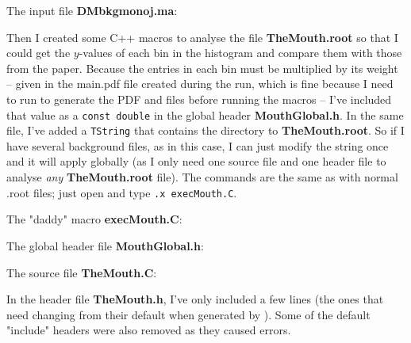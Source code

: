 The input file \textbf{DMbkgmonoj.ma}:



Then I created some C++ macros to analyse the file \textbf{TheMouth.root} so that I could get the $y$-values of each bin in the \etmiss histogram and compare them with those from the paper. Because the entries in each bin must be multiplied by its weight -- given in the main.pdf file created during the \madanalysis run, which is fine because I need to run \madanalysis to generate the PDF and \ROOT files before running the macros -- I've included that value as a \texttt{const double} in the global header \textbf{MouthGlobal.h}. In the same file, I've added a \texttt{TString} that contains the directory to \textbf{TheMouth.root}. So if I have several background files, as in this case, I can just modify the string once and it will apply globally (as I only need one source file and one header file to analyse \emph{any} \textbf{TheMouth.root} file). The commands are the same as with normal .root files; just open \ROOT and type \texttt{.x execMouth.C}.

The "daddy" macro \textbf{execMouth.C}:



The global header file \textbf{MouthGlobal.h}:



The source file \textbf{TheMouth.C}:



In the header file \textbf{TheMouth.h}, I've only included a few lines (the ones that need changing from their default when generated by \ROOT). Some of the default "include" headers were also removed as they caused errors.



